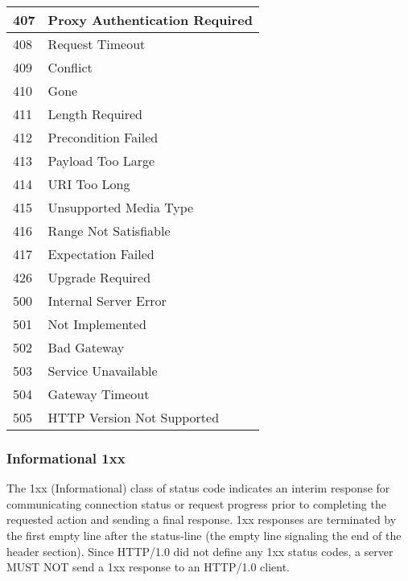 \begin{longtable}{|l|l|}
   \\ \hline 407  & Proxy Authentication Required 
   \\ \hline 408  & Request Timeout               
   \\ \hline 409  & Conflict                      
   \\ \hline 410  & Gone                          
   \\ \hline 411  & Length Required               
   \\ \hline 412  & Precondition Failed           
   \\ \hline 413  & Payload Too Large             
   \\ \hline 414  & URI Too Long                  
   \\ \hline 415  & Unsupported Media Type        
   \\ \hline 416  & Range Not Satisfiable         
   \\ \hline 417  & Expectation Failed            
   \\ \hline 426  & Upgrade Required              
   \\ \hline 500  & Internal Server Error         
   \\ \hline 501  & Not Implemented               
   \\ \hline 502  & Bad Gateway                   
   \\ \hline 503  & Service Unavailable           
   \\ \hline 504  & Gateway Timeout               
   \\ \hline 505  & HTTP Version Not Supported    
   \\ \hline
\end{longtable}

   
   
   \subsubsection{Informational 1xx}

   The 1xx (Informational) class of status code indicates an interim
   response for communicating connection status or request progress
   prior to completing the requested action and sending a final
   response. 1xx responses are terminated by the first empty line after
   the status-line (the empty line signaling the end of the header
   section).  Since HTTP/1.0 did not define any 1xx status codes, a
   server MUST NOT send a 1xx response to an HTTP/1.0 client.

  


